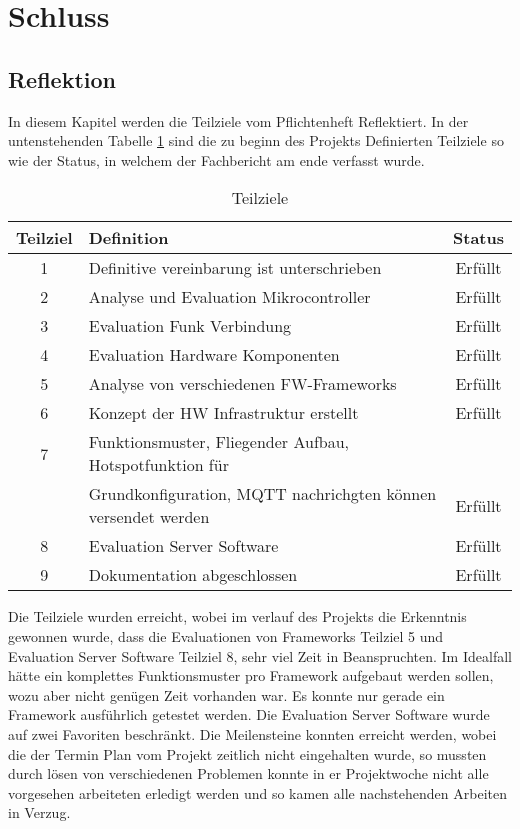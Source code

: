 \section{Schluss}

\subsection{Reflektion}

In diesem Kapitel werden die Teilziele vom Pflichtenheft Reflektiert. In der untenstehenden Tabelle \ref{tab: Teilziele} sind die zu beginn des Projekts Definierten Teilziele so wie der Status, in welchem der Fachbericht am ende verfasst wurde.
\begin{table}[h!]
	\begin{tabular}{|c|l|c|}
		\hline 
		Teilziel & Definition & Status \\ 
		\hline 
		1 & Definitive vereinbarung ist unterschrieben & Erfüllt \\ 
		\hline 
		2 & Analyse und Evaluation Mikrocontroller & Erfüllt \\ 
		\hline 
		3 & Evaluation Funk Verbindung & Erfüllt \\ 
		\hline 
		4 & Evaluation Hardware Komponenten & Erfüllt \\ 
		\hline 
		5 & Analyse von verschiedenen FW-Frameworks & Erfüllt \\ 
		\hline 
		6 & Konzept der HW Infrastruktur erstellt & Erfüllt \\ 
		\hline 
		7 & Funktionsmuster, Fliegender Aufbau, Hotspotfunktion für& \\
		& Grundkonfiguration, MQTT nachrichgten können versendet werden & Erfüllt \\ 
		\hline 
		8 & Evaluation Server Software & Erfüllt \\ 
		\hline 
		9 & Dokumentation abgeschlossen & Erfüllt \\ 
		\hline 
		\end{tabular}
	\caption{Teilziele}
	\label{tab: Teilziele}	 
\end{table}



Die Teilziele wurden erreicht, wobei im verlauf des Projekts die Erkenntnis gewonnen wurde, dass die Evaluationen von Frameworks Teilziel 5 und Evaluation Server Software Teilziel 8, sehr viel Zeit in Beanspruchten. Im Idealfall hätte ein komplettes Funktionsmuster pro Framework aufgebaut werden sollen, wozu aber nicht genügen Zeit vorhanden war. Es konnte nur gerade ein Framework ausführlich getestet werden. Die Evaluation Server Software wurde auf zwei Favoriten beschränkt. Die Meilensteine konnten erreicht werden, wobei die der Termin Plan vom Projekt zeitlich nicht eingehalten wurde, so mussten durch lösen von verschiedenen Problemen konnte in er Projektwoche nicht alle vorgesehen arbeiteten erledigt werden und so kamen alle nachstehenden Arbeiten in Verzug.

